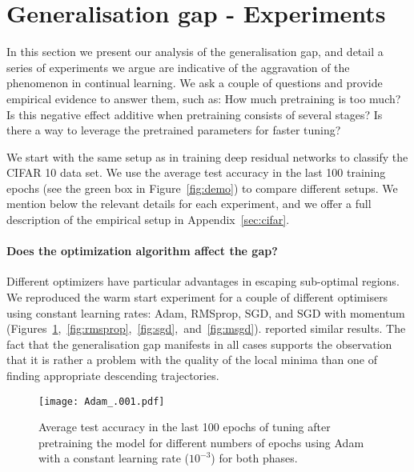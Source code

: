 \section{Generalisation gap - Experiments}
\label{sec:results}


In this section we present our analysis of the generalisation gap, and detail a series of experiments we argue are indicative of the aggravation of the phenomenon in continual learning. We ask a couple of questions and provide empirical evidence to answer them, such as: How much pretraining is too much? Is this negative effect additive when pretraining consists of several stages? Is there a way to leverage the pretrained parameters for faster tuning? 

We start with the same setup as in \cite{ash2019difficulty} training deep residual networks \cite{He_2016_CVPR} to classify the CIFAR 10 data set. We use the average test accuracy in the last 100 training epochs (see the green box in Figure~\ref{fig:demo}) to compare different setups. We mention below the relevant details for each experiment, and we offer a full description of the empirical setup in Appendix~\ref{sec:cifar}.


\paragraph{Does the optimization algorithm affect the gap?} Different optimizers have particular advantages in escaping sub-optimal regions. We reproduced the warm start experiment for a couple of different optimisers using constant learning rates: Adam, RMSprop, SGD, and SGD with momentum (Figures~\ref{fig:adam},~\ref{fig:rmsprop},~\ref{fig:sgd},~and~\ref{fig:msgd}). \citeauthor{ash2019difficulty} reported similar results. The fact that the generalisation gap manifests in all cases supports the observation that it is rather a problem with the quality of the local minima %
than one of finding appropriate descending trajectories.

\begin{figure}[h!tb]
    \centering%
    \texttt{[image: Adam\_.001.pdf]}
    \caption{Average test accuracy in the last 100 epochs of tuning after pretraining the model for different numbers of epochs using Adam with a constant learning rate ($10^{-3}$) for both phases. }
    \label{fig:adam}
\end{figure}



